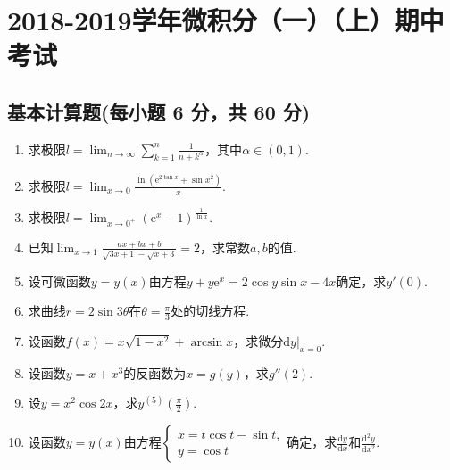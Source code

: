 \documentclass[../Main.tex]{subfiles}
\begin{document}
\chapter{2018-2019学年微积分（一）（上）期中考试}

\section{基本计算题(每小题 6 分，共 60 分)}
\begin{enumerate}
    \item 求极限$l=\lim_{n\to \infty}\sum_{k=1}^{n}\frac{1}{n+k^{\alpha}}$，其中$\alpha
              \in(0,1)$.
          \vspace{11em}

    \item 求极限$l=\lim_{x\to 0}\frac{\ln\left(\mathrm{e}^{2\tan x}+\sin x^{2}\right)}{x}$.
          \vspace{10em}

    \item 求极限$l=\lim_{x\to 0^+}\left(\mathrm{e}^{x}-1\right)^{\frac{1}{\ln x}}$.
          \vspace{11em}

    \item 已知$\lim_{x\to1}\frac{ax+bx+b}{\sqrt{3x+1}-\sqrt{x+3}}=2$，求常数$a,b$的值.
          \vspace{10em}

    \item 设可微函数$y=y(x)$由方程$y+y\mathrm{e}^{x}=2\cos y\sin x-4x$确定，求$y'
              (0)$.
          \vspace{10em}

    \item 求曲线$r=2\sin3\theta$在$\theta=\frac{\pi}{3}$处的切线方程.
          \vspace{10em}

    \item 设函数$f(x)=x\sqrt{1-x^{2}}+\arcsin x$，求微分$\left.\mathrm{d}y\right|
              _{x=0}$.
          \vspace{11em}

    \item 设函数$y=x+x^{3}$的反函数为$x=g(y)$，求$g''(2)$.
          \vspace{12em}

    \item 设$y=x^{2}\cos 2x$，求$y^{(5)}\left(\frac{\pi}{2}\right)$.
          \vspace{8em}

    \item 设函数$y=y(x)$由方程$\begin{cases}
                  x=t\cos t-\sin t, \\
                  y=\cos t
              \end{cases}$确定，求$\frac{\mathrm{d}y}{\mathrm{d}x}$和$\frac{\mathrm{d}^{2}y}{\mathrm{d}x^{2}}$.
          \vspace{8em}
\end{enumerate}
\end{document}
